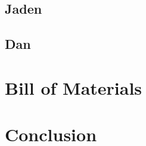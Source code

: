 \documentclass[11pt]{ieeeconf}
\begin{document}
\subsection{Jaden}

\subsection{Dan}

\section{Bill of Materials}

\section{Conclusion}



\end{document}
